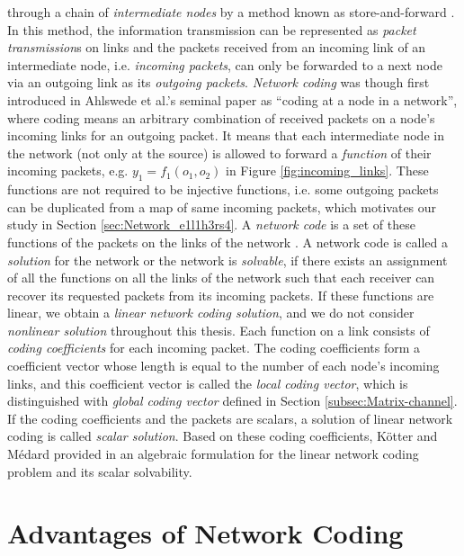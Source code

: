through a chain of \textit{intermediate nodes} by a method known as
store-and-forward \cite{Yeung:2006}. In this method, the information
transmission can be represented as \textit{packet transmission}s on
links and the packets received from an incoming link of an intermediate
node, i.e. \textit{incoming packets}, can only be forwarded to a next
node via an outgoing link as its \textit{outgoing packets}. \textit{Network
coding} was though first introduced in Ahlswede et al.'s seminal paper
\cite{Ahlswede:2000} as ``coding at a node in a network'', where
coding means an arbitrary combination of received packets on a node's
incoming links for an outgoing packet. It means that each intermediate
node in the network (not only at the source) is allowed to forward
a \textit{function} of their incoming packets, e.g. $y_{1}=f_{1}(o_{1},o_{2})$
in Figure \ref{fig:incoming_links}. These functions are not required
to be injective functions, i.e. some outgoing packets can be duplicated
from a map of same incoming packets, which motivates our study in
Section \ref{sec:Network_e1l1h3rs4}. A \textit{network code} is a
set of these functions of the packets on the links of the network
\cite{Wachter-Zeh:2018}. A network code is called a \textit{solution}
for the network or the network is \textit{solvable}, if there exists
an assignment of all the functions on all the links of the network
such that each receiver can recover its requested packets from its
incoming packets. If these functions are linear, we obtain a \textit{linear
network coding solution}, and we do not consider \textit{nonlinear
solution} throughout this thesis. Each function on a link consists
of \textit{coding coefficients} for each incoming packet. The coding
coefficients form a coefficient vector whose length is equal to the
number of each node's incoming links, and this coefficient vector
is called the \textit{local coding vector}, which is distinguished
with \textit{global coding vector} defined in Section \ref{subsec:Matrix-channel}.
If the coding coefficients and the packets are scalars, a solution
of linear network coding is called \textit{scalar solution}. Based
on these coding coefficients, K\"otter and M\'edard provided in
\cite{Koetter:2003} an algebraic formulation for the linear network
coding problem and its scalar solvability.

\section{Advantages of Network Coding \label{sec:Advantages-of-NC}}

